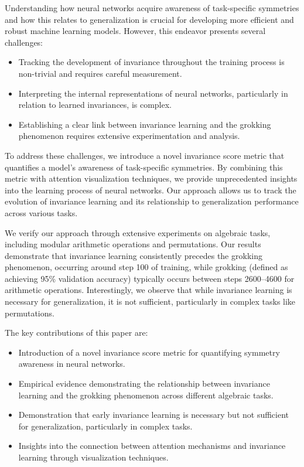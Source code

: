 \documentclass{article} %
\begin{document}
Understanding how neural networks acquire awareness of task-specific symmetries and how this relates to generalization is crucial for developing more efficient and robust machine learning models. However, this endeavor presents several challenges:

\begin{itemize}
    \item Tracking the development of invariance throughout the training process is non-trivial and requires careful measurement.
    \item Interpreting the internal representations of neural networks, particularly in relation to learned invariances, is complex.
    \item Establishing a clear link between invariance learning and the grokking phenomenon requires extensive experimentation and analysis.
\end{itemize}

To address these challenges, we introduce a novel invariance score metric that quantifies a model's awareness of task-specific symmetries. By combining this metric with attention visualization techniques, we provide unprecedented insights into the learning process of neural networks. Our approach allows us to track the evolution of invariance learning and its relationship to generalization performance across various tasks.

We verify our approach through extensive experiments on algebraic tasks, including modular arithmetic operations and permutations. Our results demonstrate that invariance learning consistently precedes the grokking phenomenon, occurring around step 100 of training, while grokking (defined as achieving 95\% validation accuracy) typically occurs between steps 2600--4600 for arithmetic operations. Interestingly, we observe that while invariance learning is necessary for generalization, it is not sufficient, particularly in complex tasks like permutations.

The key contributions of this paper are:

\begin{itemize}
    \item Introduction of a novel invariance score metric for quantifying symmetry awareness in neural networks.
    \item Empirical evidence demonstrating the relationship between invariance learning and the grokking phenomenon across different algebraic tasks.
    \item Demonstration that early invariance learning is necessary but not sufficient for generalization, particularly in complex tasks.
    \item Insights into the connection between attention mechanisms and invariance learning through visualization techniques.
\end{itemize}
\end{document}

